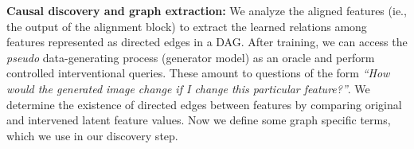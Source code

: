 \documentclass{article}
\begin{document}

\textbf{Causal discovery and graph extraction: }
We analyze the aligned features (ie., the output of the alignment block) to extract the learned relations among features represented as directed edges in a DAG.
After training, we can access the \textit{pseudo} data-generating process (generator model) as an oracle and perform controlled interventional queries. 
These amount to questions of the form \textit{``How would the generated image change if I change this particular feature?''}.
We determine the existence of directed edges between features by comparing original and intervened latent feature values.
Now we define some graph specific terms, which we use in our discovery step.
\end{document}
